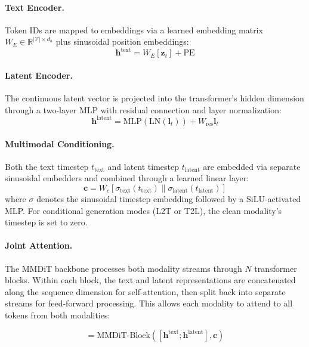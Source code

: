 \documentclass{article}
\begin{document}
\paragraph{Text Encoder.} Token IDs are mapped to embeddings via a learned embedding matrix $W_E \in \mathbb{R}^{|\mathcal{V}| \times d_h}$ plus sinusoidal position embeddings:
\begin{equation}
    \mathbf{h}^{\text{text}} = W_E[\mathbf{z}_t] + \text{PE}
\end{equation}

\paragraph{Latent Encoder.} The continuous latent vector is projected into the transformer's hidden dimension through a two-layer MLP with residual connection and layer normalization:
\begin{equation}
    \mathbf{h}^{\text{latent}} = \text{MLP}(\text{LN}(\mathbf{l}_t)) + W_{\text{res}} \mathbf{l}_t
\end{equation}

\paragraph{Multimodal Conditioning.} Both the text timestep $t_{\text{text}}$ and latent timestep $t_{\text{latent}}$ are embedded via separate sinusoidal embedders and combined through a learned linear layer:
\begin{equation}
    \mathbf{c} = W_c [\sigma_{\text{text}}(t_{\text{text}}) \| \sigma_{\text{latent}}(t_{\text{latent}})]
\end{equation}
where $\sigma$ denotes the sinusoidal timestep embedding followed by a SiLU-activated MLP. For conditional generation modes (L2T or T2L), the clean modality's timestep is set to zero.

\paragraph{Joint Attention.} The MMDiT backbone processes both modality streams through $N$ transformer blocks. Within each block, the text and latent representations are concatenated along the sequence dimension for self-attention, then split back into separate streams for feed-forward processing. This allows each modality to attend to all tokens from both modalities:

\begin{equation}
    [\mathbf{h}^{\text{text}}; \mathbf{h}^{\text{latent}}] = \text{MMDiT-Block}([\mathbf{h}^{\text{text}}; \mathbf{h}^{\text{latent}}], \mathbf{c})
\end{equation}
\end{document}
